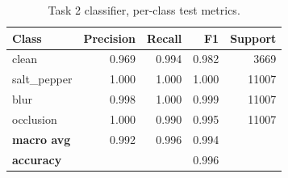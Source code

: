 \begin{table}[t]
\centering
\caption{Task 2 classifier, per-class test metrics.}
\label{tab:t2_cls}
\footnotesize
\begin{tabular}{lrrrr}
\toprule
Class & Precision & Recall & F1 & Support \\
\midrule
clean & 0.969 & 0.994 & 0.982 & 3669 \\
salt\_pepper & 1.000 & 1.000 & 1.000 & 11007 \\
blur & 0.998 & 1.000 & 0.999 & 11007 \\
occlusion & 1.000 & 0.990 & 0.995 & 11007 \\
\textbf{macro avg} & 0.992 & 0.996 & 0.994 &  \\
\textbf{accuracy} &  &  & 0.996 &  \\
\bottomrule
\end{tabular}
\end{table}
